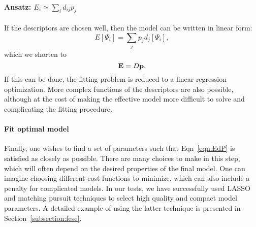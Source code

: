 \paragraph{Ansatz: $E_i \simeq \sum_i  d_{ij} p_j$} 
If the descriptors are chosen well, then the model can be written in linear form:
\begin{equation}
E[\Psi_i] = \sum_j p_j d_j[\Psi_i],	
\end{equation}
which we shorten to 
\begin{equation}
{\bf E} = D{\bf p} .
\label{eqn:EdP}
\end{equation}
If this can be done, the fitting problem is reduced to a linear regression optimization.
More complex functions of the descriptors are also possible, although at the cost of making the effective model more difficult to solve and complicating the fitting procedure.


\paragraph{Fit optimal model}
Finally, one wishes to find a set of parameters such that Eqn~\ref{eqn:EdP} is satisfied as closely as possible. 
There are many choices to make in this step, which will often depend on the desired properties of the final model. 
One can imagine choosing different cost functions to minimize, which can also include a penalty for complicated models. 
In our tests, we have successfully used LASSO \cite{Lasso}  and matching pursuit techniques \cite{MP_Zhang1993}   to select high quality and compact model parameters. 
A detailed example of using the latter technique is presented in Section~\ref{subsection:fese}.


